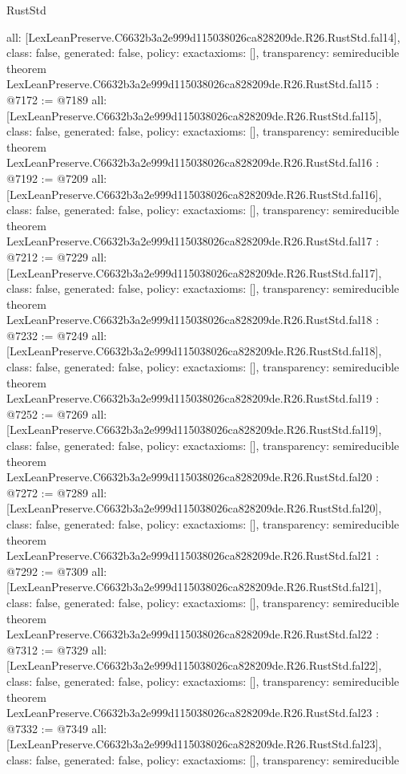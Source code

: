 \begin{lexlean}{RustStd}
\begin{coremodule}
{  all: [LexLeanPreserve.C6632b3a2e999d115038026ca828209de.R26.RustStd.fal14],
  class: false,
  generated: false,
  policy: exact{axioms: []},
  transparency: semireducible
}
theorem LexLeanPreserve.C6632b3a2e999d115038026ca828209de.R26.RustStd.fal15 : @7172 := @7189 {
  all: [LexLeanPreserve.C6632b3a2e999d115038026ca828209de.R26.RustStd.fal15],
  class: false,
  generated: false,
  policy: exact{axioms: []},
  transparency: semireducible
}
theorem LexLeanPreserve.C6632b3a2e999d115038026ca828209de.R26.RustStd.fal16 : @7192 := @7209 {
  all: [LexLeanPreserve.C6632b3a2e999d115038026ca828209de.R26.RustStd.fal16],
  class: false,
  generated: false,
  policy: exact{axioms: []},
  transparency: semireducible
}
theorem LexLeanPreserve.C6632b3a2e999d115038026ca828209de.R26.RustStd.fal17 : @7212 := @7229 {
  all: [LexLeanPreserve.C6632b3a2e999d115038026ca828209de.R26.RustStd.fal17],
  class: false,
  generated: false,
  policy: exact{axioms: []},
  transparency: semireducible
}
theorem LexLeanPreserve.C6632b3a2e999d115038026ca828209de.R26.RustStd.fal18 : @7232 := @7249 {
  all: [LexLeanPreserve.C6632b3a2e999d115038026ca828209de.R26.RustStd.fal18],
  class: false,
  generated: false,
  policy: exact{axioms: []},
  transparency: semireducible
}
theorem LexLeanPreserve.C6632b3a2e999d115038026ca828209de.R26.RustStd.fal19 : @7252 := @7269 {
  all: [LexLeanPreserve.C6632b3a2e999d115038026ca828209de.R26.RustStd.fal19],
  class: false,
  generated: false,
  policy: exact{axioms: []},
  transparency: semireducible
}
theorem LexLeanPreserve.C6632b3a2e999d115038026ca828209de.R26.RustStd.fal20 : @7272 := @7289 {
  all: [LexLeanPreserve.C6632b3a2e999d115038026ca828209de.R26.RustStd.fal20],
  class: false,
  generated: false,
  policy: exact{axioms: []},
  transparency: semireducible
}
theorem LexLeanPreserve.C6632b3a2e999d115038026ca828209de.R26.RustStd.fal21 : @7292 := @7309 {
  all: [LexLeanPreserve.C6632b3a2e999d115038026ca828209de.R26.RustStd.fal21],
  class: false,
  generated: false,
  policy: exact{axioms: []},
  transparency: semireducible
}
theorem LexLeanPreserve.C6632b3a2e999d115038026ca828209de.R26.RustStd.fal22 : @7312 := @7329 {
  all: [LexLeanPreserve.C6632b3a2e999d115038026ca828209de.R26.RustStd.fal22],
  class: false,
  generated: false,
  policy: exact{axioms: []},
  transparency: semireducible
}
theorem LexLeanPreserve.C6632b3a2e999d115038026ca828209de.R26.RustStd.fal23 : @7332 := @7349 {
  all: [LexLeanPreserve.C6632b3a2e999d115038026ca828209de.R26.RustStd.fal23],
  class: false,
  generated: false,
  policy: exact{axioms: []},
  transparency: semireducible
}
\end{coremodule}
\end{lexlean}
